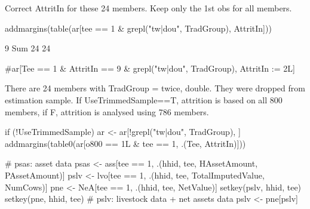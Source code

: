 Correct \textsf{AttritIn} for these 24 members. Keep only the 1st obs for all members.
\begin{Schunk}
\begin{Sinput}
addmargins(table(ar[tee == 1 & grepl("tw|dou", TradGroup), AttritIn]))
\end{Sinput}
\begin{Soutput}

  9 Sum 
 24  24 
\end{Soutput}
\begin{Sinput}
#ar[Tee == 1 & AttritIn == 9 & grepl("tw|dou", TradGroup), AttritIn := 2L]
\end{Sinput}
\end{Schunk}
There are 24 members with TradGroup = twice, double. They were dropped from estimation sample. If \textsf{UseTrimmedSample==T}, attrition is based on all 800 members, if \textsf{F}, attrition is analysed using 786 members.
\begin{Schunk}
\begin{Sinput}
if (!UseTrimmedSample) ar <- ar[!grepl("tw|dou", TradGroup), ]
addmargins(table0(ar[o800 == 1L & tee == 1, .(Tee, AttritIn)]))
\end{Sinput}
\end{Schunk}
\begin{Schunk}
\begin{Sinput}
# psas: asset data
psas <- ass[tee == 1, .(hhid, tee, HAssetAmount, PAssetAmount)]
pslv <- lvo[tee == 1, .(hhid, tee, TotalImputedValue, NumCows)]
pne <- NeA[tee == 1, .(hhid, tee, NetValue)]
setkey(pslv, hhid, tee)
setkey(pne, hhid, tee)
# pslv: livestock data + net assets data
pslv <- pne[pslv]
\end{Sinput}
\end{Schunk}
